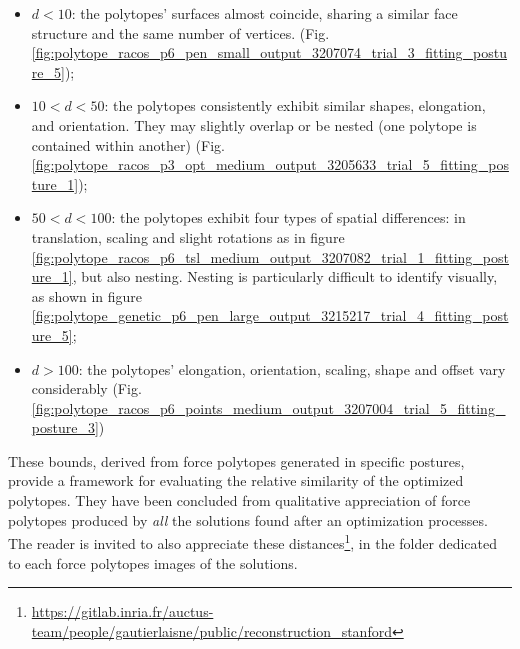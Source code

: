 
\begin{itemize}[noitemsep]
    \item {$d<10$: the polytopes' surfaces almost coincide, sharing a similar face structure and the same number of vertices. (Fig. \ref{fig:polytope_racos_p6_pen_small_output_3207074_trial_3_fitting_posture_5});}
    \item {$10<d<50$: the polytopes consistently exhibit similar shapes, elongation, and orientation. They may slightly overlap or be nested (one polytope is contained within another) (Fig. \ref{fig:polytope_racos_p3_opt_medium_output_3205633_trial_5_fitting_posture_1});}
    \item {$50 < d < 100$: the polytopes exhibit four types of spatial differences: in translation, scaling and slight rotations as in figure \ref{fig:polytope_racos_p6_tsl_medium_output_3207082_trial_1_fitting_posture_1}, but also nesting. Nesting is particularly difficult to identify visually, as shown in figure \ref{fig:polytope_genetic_p6_pen_large_output_3215217_trial_4_fitting_posture_5};}
    \item {$d >100$: the polytopes' elongation, orientation, scaling, shape and offset vary considerably (Fig. \ref{fig:polytope_racos_p6_points_medium_output_3207004_trial_5_fitting_posture_3})}
\end{itemize}

These bounds, derived from force polytopes generated in specific postures, provide a framework for evaluating the relative similarity of the optimized polytopes.
They have been concluded from qualitative appreciation of force polytopes produced by \emph{all} the solutions found after an optimization processes. The reader is invited to also appreciate these distances\footnote{\url{https://gitlab.inria.fr/auctus-team/people/gautierlaisne/public/reconstruction_stanford}}, in the folder dedicated to each force polytopes images of the solutions.

